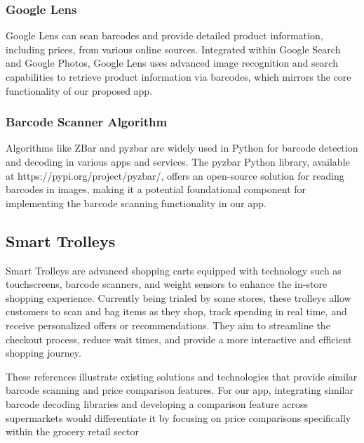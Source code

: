 \documentclass[conference]{IEEEtran}
\begin{document}
\subsubsection{Google Lens}
Google Lens can scan barcodes and provide detailed product information, including prices, from various online sources. Integrated within Google Search and Google Photos, Google Lens uses advanced image recognition and search capabilities to retrieve product information via barcodes, which mirrors the core functionality of our proposed app.

\subsubsection{Barcode Scanner Algorithm}
Algorithms like ZBar and pyzbar are widely used in Python for barcode detection and decoding in various apps and services. The pyzbar Python library, available at https://pypi.org/project/pyzbar/, offers an open-source solution for reading barcodes in images, making it a potential foundational component for implementing the barcode scanning functionality in our app.\\

\subsection{Smart Trolleys}
Smart Trolleys are advanced shopping carts equipped with technology such as touchscreens, barcode scanners, and weight sensors to enhance the in-store shopping experience. Currently being trialed by some stores, these trolleys allow customers to scan and bag items as they shop, track spending in real time, and receive personalized offers or recommendations. They aim to streamline the checkout process, reduce wait times, and provide a more interactive and efficient shopping journey.


These references illustrate existing solutions and technologies that provide similar barcode
scanning and price comparison features. For our app, integrating similar barcode decoding
libraries and developing a comparison feature across supermarkets would differentiate it by
focusing on price comparisons specifically within the grocery retail sector
\end{document}
